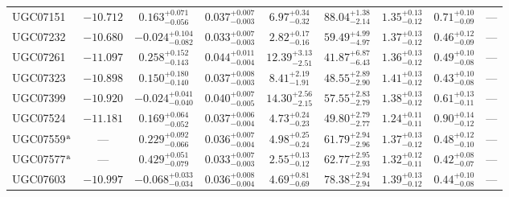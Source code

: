 \documentclass[twocolumn,tighten]{aastex63}
\begin{document}
\begin{table}
\begin{center}
\begin{tabular}{lcccccccc}
   UGC07151 & $ -10.712 $ & $ 0.163 _{ -0.056 } ^{ + 0.071 } $ & $ 0.037 _{ -0.003 } ^{ + 0.007 } $ & $ 6.97 _{ -0.32 } ^{ + 0.34 } $ & $ 88.04 _{ -2.14 } ^{ + 1.38 } $ & $ 1.35 _{ -0.12 } ^{ + 0.13 } $ & $ 0.71 _{ -0.09 } ^{ + 0.10 } $ & --- \\  
   UGC07232 & $ -10.680 $ & $ -0.024 _{ -0.082 } ^{ + 0.104 } $ & $ 0.033 _{ -0.003 } ^{ + 0.007 } $ & $ 2.82 _{ -0.16 } ^{ + 0.17 } $ & $ 59.49 _{ -4.97 } ^{ + 4.99 } $ & $ 1.37 _{ -0.12 } ^{ + 0.13 } $ & $ 0.46 _{ -0.09 } ^{ + 0.12 } $ & --- \\  
   UGC07261 & $ -11.097 $ & $ 0.258 _{ -0.143 } ^{ + 0.152 } $ & $ 0.044 _{ -0.004 } ^{ + 0.011 } $ & $ 12.39 _{ -2.51 } ^{ + 3.13 } $ & $ 41.87 _{ -6.43 } ^{ + 6.87 } $ & $ 1.36 _{ -0.12 } ^{ + 0.13 } $ & $ 0.49 _{ -0.08 } ^{ + 0.10 } $ & --- \\  
   UGC07323 & $ -10.898 $ & $ 0.150 _{ -0.140 } ^{ + 0.180 } $ & $ 0.037 _{ -0.003 } ^{ + 0.008 } $ & $ 8.41 _{ -1.91 } ^{ + 2.19 } $ & $ 48.55 _{ -2.90 } ^{ + 2.89 } $ & $ 1.41 _{ -0.12 } ^{ + 0.13 } $ & $ 0.43 _{ -0.08 } ^{ + 0.10 } $ & --- \\  
   UGC07399 & $ -10.920 $ & $ -0.024 _{ -0.040 } ^{ + 0.041 } $ & $ 0.040 _{ -0.005 } ^{ + 0.007 } $ & $ 14.30 _{ -2.15 } ^{ + 2.56 } $ & $ 57.55 _{ -2.79 } ^{ + 2.83 } $ & $ 1.38 _{ -0.12 } ^{ + 0.13 } $ & $ 0.61 _{ -0.11 } ^{ + 0.13 } $ & --- \\  
   UGC07524 & $ -11.181 $ & $ 0.169 _{ -0.052 } ^{ + 0.064 } $ & $ 0.037 _{ -0.004 } ^{ + 0.006 } $ & $ 4.73 _{ -0.23 } ^{ + 0.24 } $ & $ 49.80 _{ -2.77 } ^{ + 2.79 } $ & $ 1.24 _{ -0.11 } ^{ + 0.11 } $ & $ 0.90 _{ -0.12 } ^{ + 0.14 } $ & --- \\  
   UGC07559$^{\rm a}$ &  ---  & $ 0.229 _{ -0.066 } ^{ + 0.092 } $ & $ 0.036 _{ -0.004 } ^{ + 0.007 } $ & $ 4.98 _{ -0.24 } ^{ + 0.25 } $ & $ 61.79 _{ -2.96 } ^{ + 2.94 } $ & $ 1.37 _{ -0.12 } ^{ + 0.13 } $ & $ 0.48 _{ -0.10 } ^{ + 0.12 } $ & --- \\  
   UGC07577$^{\rm a}$ &  ---  & $ 0.429 _{ -0.079 } ^{ + 0.051 } $ & $ 0.033 _{ -0.003 } ^{ + 0.007 } $ & $ 2.55 _{ -0.12 } ^{ + 0.13 } $ & $ 62.77 _{ -2.93 } ^{ + 2.95 } $ & $ 1.32 _{ -0.11 } ^{ + 0.12 } $ & $ 0.42 _{ -0.07 } ^{ + 0.08 } $ & --- \\  
   UGC07603 & $ -10.997 $ & $ -0.068 _{ -0.034 } ^{ + 0.033 } $ & $ 0.036 _{ -0.004 } ^{ + 0.008 } $ & $ 4.69 _{ -0.69 } ^{ + 0.81 } $ & $ 78.38 _{ -2.94 } ^{ + 2.94 } $ & $ 1.39 _{ -0.12 } ^{ + 0.13 } $ & $ 0.44 _{ -0.08 } ^{ + 0.10 } $ & --- \\  

\end{tabular}
\end{center}
\end{table}
\end{document}
